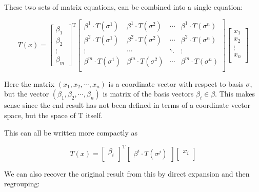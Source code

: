 \documentclass{article}      %
\begin{document}
These two sets of matrix equations, can be combined into a single equation:

\begin{equation}\label{eqn:matrixexpansion}
T(x) = 
{
\begin{bmatrix}
\beta_1 \\
\beta_2 \\
\vdots \\
\beta_m
\end{bmatrix}
}^{\text{T}}
\begin{bmatrix}
\beta^1 \cdot T(\sigma^1) & \beta^1 \cdot T(\sigma^2) & \cdots & \beta^1 \cdot T(\sigma^n) \\
\beta^2 \cdot T(\sigma^1) & \beta^2 \cdot T(\sigma^2) & \cdots & \beta^2 \cdot T(\sigma^n) \\
\vdots & \cdots & \ddots & \vdots \\
\beta^m \cdot T(\sigma^1) & \beta^m \cdot T(\sigma^2) & \cdots & \beta^m \cdot T(\sigma^n) \\
\end{bmatrix}
\begin{bmatrix}
x_1 \\
x_2 \\
\vdots \\
x_n \\
\end{bmatrix}
\end{equation}

Here the matrix $( x_1, x_2, \cdots, x_n )$ is a coordinate vector with respect to basis $\sigma$, but the vector 
$( \beta_1, \beta_2, \cdots, \beta_n )$ is matrix of the basis vectors $\beta_i \in \beta$.  This makes sense since the end result has not been defined in terms of
a coordinate vector space, but the space of T itself.

This can all be written more compactly as 

\begin{equation}
T(x)
= 
{
\begin{bmatrix}
\beta_i \\
\end{bmatrix}
}^{\text{T}}
\begin{bmatrix}
\beta^i \cdot T(\sigma^j)
\end{bmatrix}
\begin{bmatrix}
x_i \\
\end{bmatrix}
\end{equation}

We can also recover the original result from this by direct expansion and then regrouping:
\end{document}
